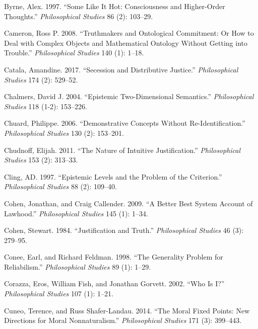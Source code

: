 \documentclass[
  10pt,
  letterpaper,
  DIV=11,
  numbers=noendperiod,
  twoside]{scrartcl}
\newlength{\cslhangindent}
\newenvironment{CSLReferences}[2] %
 {\begin{list}{}{%
  \setlength{\itemindent}{0pt}
  \setlength{\leftmargin}{0pt}
  \setlength{\parsep}{0pt}
  \ifodd #1
   \setlength{\leftmargin}{\cslhangindent}
   \setlength{\itemindent}{-1\cslhangindent}
  \fi
  \setlength{\itemsep}{#2\baselineskip}}}
 {\end{list}}
\begin{document}
\begin{CSLReferences}{1}{0}
Byrne, Alex. 1997. {``Some Like It Hot: Consciousness and Higher-Order
Thoughts.''} \emph{Philosophical Studies} 86 (2): 103--29.

Cameron, Ross P. 2008. {``Truthmakers and Ontological Commitment: Or How
to Deal with Complex Objects and Mathematical Ontology Without Getting
into Trouble.''} \emph{Philosophical Studies} 140 (1): 1--18.

Catala, Amandine. 2017. {``Secession and Distributive Justice.''}
\emph{Philosophical Studies} 174 (2): 529--52.

Chalmers, David J. 2004. {``Epistemic Two-Dimensional Semantics.''}
\emph{Philosophical Studies} 118 (1-2): 153--226.

Chuard, Philippe. 2006. {``Demonstrative Concepts Without
Re-Identification.''} \emph{Philosophical Studies} 130 (2): 153--201.

Chudnoff, Elijah. 2011. {``The Nature of Intuitive Justification.''}
\emph{Philosophical Studies} 153 (2): 313--33.

Cling, AD. 1997. {``Epistemic Levels and the Problem of the
Criterion.''} \emph{Philosophical Studies} 88 (2): 109--40.

Cohen, Jonathan, and Craig Callender. 2009. {``A Better Best System
Account of Lawhood.''} \emph{Philosophical Studies} 145 (1): 1--34.

Cohen, Stewart. 1984. {``Justification and Truth.''} \emph{Philosophical
Studies} 46 (3): 279--95.

Conee, Earl, and Richard Feldman. 1998. {``The Generality Problem for
Reliabilism.''} \emph{Philosophical Studies} 89 (1): 1--29.

Corazza, Eros, William Fish, and Jonathan Gorvett. 2002. {``Who Is
{I}?''} \emph{Philosophical Studies} 107 (1): 1--21.

Cuneo, Terence, and Russ Shafer-Landau. 2014. {``The Moral Fixed Points:
New Directions for Moral Nonnaturalism.''} \emph{Philosophical Studies}
171 (3): 399--443.


\end{CSLReferences}
\end{document}
